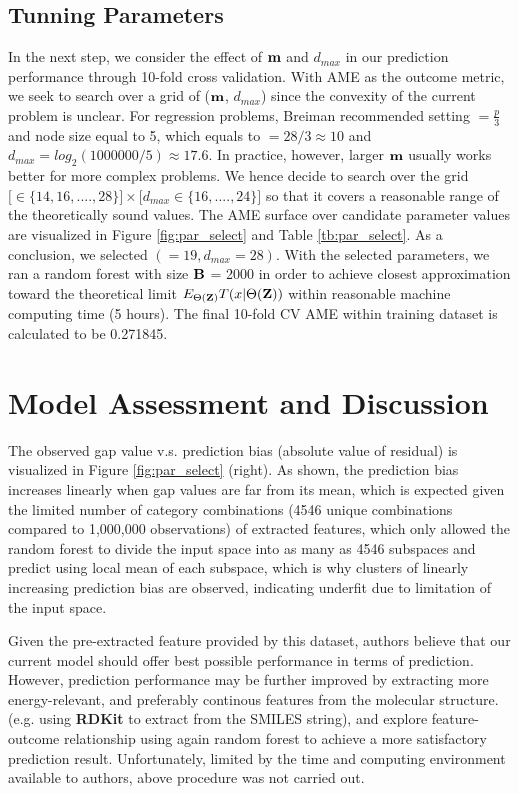\documentclass[11pt]{article}
\theoremstyle{definition}
\begin{document}
\subsection{\textbf{Tunning Parameters}}
In the next step, we consider the effect of ${\bf m}$ and $d_{max}$ in our prediction performance through 10-fold cross validation. With AME as the outcome metric, we seek to search over a grid of (${\bf m}$, $d_{max}$) since the convexity of the current problem is unclear. For regression problems, Breiman recommended setting $\bm = \frac{p}{3}$ and node size equal to 5, which equals to $\bm = 28/3 \approx 10$ and $d_{max} = log_2(1000000/5) \approx 17.6$. In practice, however, larger ${\bf m}$ usually works better for more complex problems. We hence decide to search over the grid $\big[ \bm \in \{14, 16, ...., 28\} \big] \times \big[ d_{max} \in \{16, ...., 24\} \big]$ so that it covers a reasonable range of the theoretically sound values. The AME surface over candidate parameter values are visualized in Figure \ref{fig:par_select} and Table \ref{tb:par_select}. As a conclusion, we selected $(\bm = 19, d_{max} = 28)$. With the selected parameters, we ran a random forest with size ${\bf B}$ = 2000 in order to achieve closest approximation toward the theoretical limit $E_{\Theta({\bf Z})}T(x|\Theta({\bf Z}))$ within reasonable machine computing time (5 hours). The final 10-fold CV AME within training dataset is calculated to be 0.271845.

\newpage
\section{\textbf{Model Assessment and Discussion}}
The observed gap value v.s. prediction bias (absolute value of residual) is visualized in Figure \ref{fig:par_select} (right). As shown, the prediction bias increases linearly when gap values are far from its mean, which is expected given the limited number of category combinations (4546 unique combinations compared to 1,000,000 observations) of extracted features, which only allowed the random forest to divide the input space into as many as 4546 subspaces and predict using local mean of each subspace, which is why  clusters of linearly increasing prediction bias are observed, indicating underfit due to limitation of the input space.

Given the pre-extracted feature provided by this dataset, authors believe that  our current model should offer best possible performance in terms of prediction. However, prediction performance may be further improved by extracting more energy-relevant, and preferably continous features from the molecular structure. (e.g. using \textbf{RDKit} to extract from the SMILES string), and explore feature-outcome relationship  using again random forest to achieve a more satisfactory prediction result. Unfortunately, limited by the time and computing environment available to authors, above procedure was not carried out.
\end{document}
